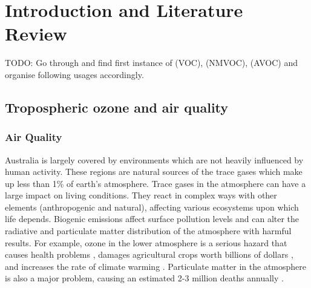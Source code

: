 
%
\chapter{Introduction and Literature Review} %
\label{LR}

TODO: Go through and find first instance of (VOC), (NMVOC), (AVOC) and organise following usages accordingly.

\section{Tropospheric ozone and air quality}
  \label{LR:O3andAQ}
  \subsection{Air Quality}
    \label{LR:O3andAQ:AQ}
    Australia is largely covered by environments which are not heavily influenced by human activity.
    These regions are natural sources of the trace gases which make up less than 1\% of earth's atmosphere.
    Trace gases in the atmosphere can have a large impact on living conditions.
    They react in complex ways with other elements (anthropogenic and natural), affecting various ecosystems upon which life depends.
    Biogenic emissions affect surface pollution levels and can alter the radiative and particulate matter distribution of the atmosphere with harmful results.
    For example, ozone in the lower atmosphere is a serious hazard that causes health problems \citep{Hsieh2013}, damages agricultural crops worth billions of dollars \citep{Avnery2011}, and increases the rate of climate warming \citep{IPCC_2013_chap8}.
    Particulate matter in the atmosphere is also a major problem, causing an estimated 2-3 million deaths annually \citep{Hoek2013, Krewski2009, Silva2013, Lelieveld2015}. 
    
